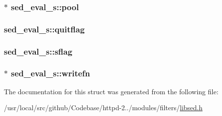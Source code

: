 \subsubsection[{\texorpdfstring{pool}{pool}}]{$\ast$ sed\+\_\+eval\+\_\+s\+::pool}\hypertarget{structsed__eval__s_a174ec7fea803b5a7008d460a7288bd20}{}\label{structsed__eval__s_a174ec7fea803b5a7008d460a7288bd20}
\subsubsection[{\texorpdfstring{quitflag}{quitflag}}]{ sed\+\_\+eval\+\_\+s\+::quitflag}\hypertarget{structsed__eval__s_aaf660a3f58ace1338543f57ac5a713c2}{}\label{structsed__eval__s_aaf660a3f58ace1338543f57ac5a713c2}
\subsubsection[{\texorpdfstring{sflag}{sflag}}]{ sed\+\_\+eval\+\_\+s\+::sflag}\hypertarget{structsed__eval__s_ac80ba0bb82ac66a912f1fdaa8735c5a7}{}\label{structsed__eval__s_ac80ba0bb82ac66a912f1fdaa8735c5a7}
\subsubsection[{\texorpdfstring{writefn}{writefn}}]{$\ast$ sed\+\_\+eval\+\_\+s\+::writefn}\hypertarget{structsed__eval__s_a212836040501592e9e950a5c873e142a}{}\label{structsed__eval__s_a212836040501592e9e950a5c873e142a}


The documentation for this struct was generated from the following file\+:\begin{DoxyCompactItemize}
\item 
/usr/local/src/github/\+Codebase/httpd-\/2../modules/filters/\hyperlink{libsed_8h}{libsed.\+h}\end{DoxyCompactItemize}

